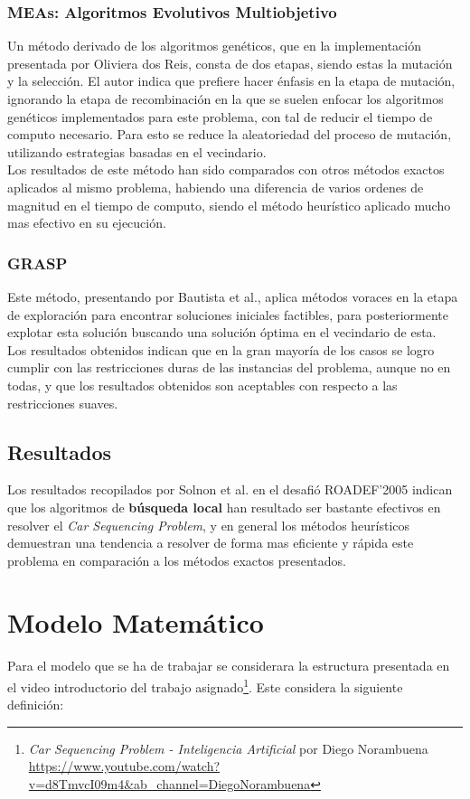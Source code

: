 \documentclass[letter, 10pt]{article}
\begin{document}
\subsubsection{MEAs: Algoritmos Evolutivos Multiobjetivo}
Un método derivado de los algoritmos genéticos, que en la implementación presentada por Oliviera dos Reis\cite{Oliveira_dos_Reis_2007}, consta de dos etapas, siendo estas la mutación y la selección. El autor indica que prefiere hacer énfasis en la etapa de mutación, ignorando la etapa de recombinación en la que se suelen enfocar los algoritmos genéticos implementados para este problema, con tal de reducir el tiempo de computo necesario. Para esto se reduce la aleatoriedad del proceso de mutación, utilizando estrategias basadas en el vecindario.\\
Los resultados de este método han sido comparados con otros métodos exactos aplicados al mismo problema, habiendo una diferencia de varios ordenes de magnitud en el tiempo de computo, siendo el método heurístico aplicado mucho mas efectivo en su ejecución.

\subsubsection{GRASP}
Este método, presentando por Bautista et al.\cite{Bautista_Pereira_Adenso-Diaz_2007}, aplica métodos voraces en la etapa de exploración para encontrar soluciones iniciales factibles, para posteriormente explotar esta solución buscando una solución óptima en el vecindario de esta.\\
Los resultados obtenidos indican que en la gran mayoría de los casos se logro cumplir con las restricciones duras de las instancias del problema, aunque no en todas, y que los resultados obtenidos son aceptables con respecto a las restricciones suaves.

\subsection{Resultados}
Los resultados recopilados por Solnon et al. en el desafió ROADEF'2005 indican que los algoritmos de \textbf{búsqueda local} han resultado ser bastante efectivos en resolver el \textit{Car Sequencing Problem}, y en general los métodos heurísticos demuestran una tendencia a resolver de forma mas eficiente y rápida este problema en comparación a los métodos exactos presentados.

\section{Modelo Matemático}
Para el modelo que se ha de trabajar se considerara la estructura presentada en el video introductorio del trabajo asignado\footnote{\textit{Car Sequencing Problem - Inteligencia Artificial} por Diego Norambuena\\\url{https://www.youtube.com/watch?v=d8TmvcI09m4&ab_channel=DiegoNorambuena}}. Este considera la siguiente definición:
\end{document}
